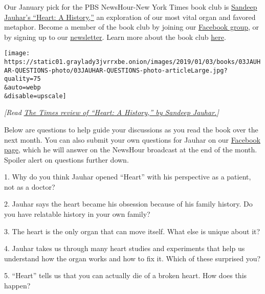 Our January pick for the PBS NewsHour-New York Times book club is
\href{https://www.nytimes3xbfgragh.onion/2018/11/05/books/review/heart-sandeep-jauhar.html?rref=collection\%2Fspotlightcollection\%2Fnow-read-this\&action=click\&contentCollection=books\&region=rank\&module=package\&version=highlights\&contentPlacement=2\&pgtype=collection}{Sandeep
Jauhar's ``Heart: A History,''} an exploration of our most vital organ
and favored metaphor. Become a member of the book club by joining our
\href{https://www.facebookcorewwwi.onion/groups/NowReadThisBookClub}{Facebook
group}, or by signing up to our
\href{https://pbs.us1.list-manage.com/subscribe?u=8aa1c620fd96b27384151c36e\&id=2fe6581b35}{newsletter}.
Learn more about the book club
\href{https://www.pbs.org/newshour/arts/what-is-now-read-this}{here}.

\texttt{[image: https://static01.graylady3jvrrxbe.onion/images/2019/01/03/books/03JAUHAR-QUESTIONS-photo/03JAUHAR-QUESTIONS-photo-articleLarge.jpg?quality=75\\\&auto=webp\\\&disable=upscale]}

\emph{{[}Read}
\href{https://www.nytimes3xbfgragh.onion/2018/11/05/books/review/heart-sandeep-jauhar.html?rref=collection\%2Fspotlightcollection\%2Fnow-read-this\&action=click\&contentCollection=books\&region=rank\&module=package\&version=highlights\&contentPlacement=2\&pgtype=collection}{\emph{The
Times review of ``Heart: A History,'' by Sandeep Jauhar.}}\emph{{]}}

Below are questions to help guide your discussions as you read the book
over the next month. You can also submit your own questions for Jauhar
on our
\href{https://www.facebookcorewwwi.onion/groups/NowReadThisBookClub}{Facebook
page}, which he will answer on the NewsHour broadcast at the end of the
month. Spoiler alert on questions further down.

1. Why do you think Jauhar opened ``Heart'' with his perspective as a
patient, not as a doctor?

2. Jauhar says the heart became his obsession because of his family
history. Do you have relatable history in your own family?

3. The heart is the only organ that can move itself. What else is unique
about it?

4. Jauhar takes us through many heart studies and experiments that help
us understand how the organ works and how to fix it. Which of these
surprised you?

5. ``Heart'' tells us that you can actually die of a broken heart. How
does this happen?

